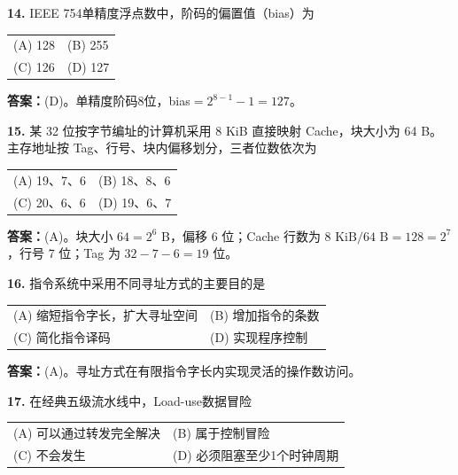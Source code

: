 \vspace{6pt}

\noindent\textbf{14.} IEEE 754单精度浮点数中，阶码的偏置值（bias）为
\begin{center}
\begin{tabular}{ll}
(A) 128 & (B) 255 \\[6pt]
(C) 126 & (D) 127
\end{tabular}
\end{center}

\ifshowsolutions\par\noindent\textbf{答案：}(D)。单精度阶码8位，bias$=2^{8-1}-1=127$。\else \answerarea \fi

\vspace{6pt}

\noindent\textbf{15.} 某 32 位按字节编址的计算机采用 8 KiB 直接映射 Cache，块大小为 64 B。主存地址按 Tag、行号、块内偏移划分，三者位数依次为
\begin{center}
\begin{tabular}{ll}
(A) 19、7、6 & (B) 18、8、6 \\[6pt]
(C) 20、6、6 & (D) 19、6、7
\end{tabular}
\end{center}

\ifshowsolutions\par\noindent\textbf{答案：}(A)。块大小 $64=2^6$ B，偏移 6 位；Cache 行数为 $8\text{ KiB}/64\text{ B}=128=2^7$，行号 7 位；Tag 为 $32-7-6=19$ 位。\else \answerarea \fi

\vspace{6pt}

\noindent\textbf{16.} 指令系统中采用不同寻址方式的主要目的是
\begin{center}
\begin{tabular}{ll}
(A) 缩短指令字长，扩大寻址空间 & (B) 增加指令的条数 \\[6pt]
(C) 简化指令译码 & (D) 实现程序控制
\end{tabular}
\end{center}

\ifshowsolutions\par\noindent\textbf{答案：}(A)。寻址方式在有限指令字长内实现灵活的操作数访问。\else \answerarea \fi

\vspace{6pt}

\noindent\textbf{17.} 在经典五级流水线中，Load-use数据冒险
\begin{center}
\begin{tabular}{ll}
(A) 可以通过转发完全解决 & (B) 属于控制冒险 \\[6pt]
(C) 不会发生 & (D) 必须阻塞至少1个时钟周期
\end{tabular}
\end{center}

